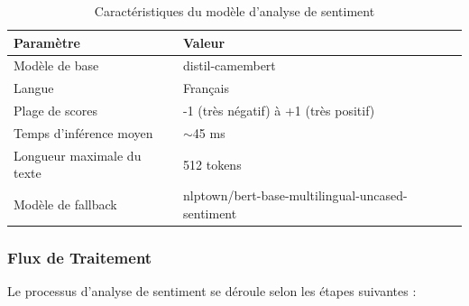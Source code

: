 \documentclass[11pt,a4paper]{report}
\begin{document}
\begin{table}[H]
    \centering
    \caption{Caractéristiques du modèle d'analyse de sentiment}
    \label{tab:modele_sentiment}
    \begin{tabular}{|l|l|}
        \hline
        \textbf{Paramètre} & \textbf{Valeur} \\
        \hline
        Modèle de base & distil-camembert \\
        Langue & Français \\
        Plage de scores & -1 (très négatif) à +1 (très positif) \\
        Temps d'inférence moyen & $\sim$45 ms \\
        Longueur maximale du texte & 512 tokens \\
        Modèle de fallback & nlptown/bert-base-multilingual-uncased-sentiment \\
        \hline
    \end{tabular}
\end{table}

\subsubsection{Flux de Traitement}
Le processus d'analyse de sentiment se déroule selon les étapes suivantes :
\end{document}
